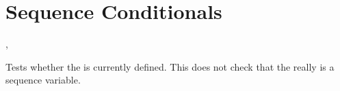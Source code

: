 \documentclass[oneside]{book}
\begin{document}


\section{Sequence Conditionals}

\begin{function}{\SeqIfExist,\SeqIfExistTF}
\begin{syntax}
 
   
\end{syntax}
Tests whether the  is currently defined.  This does not
check that the  really is a sequence variable.
\begin{demohigh}
\SeqIfExistTF {} {}
\SeqIfExistTF {} {}
\end{demohigh}
\end{function}
\end{document}
